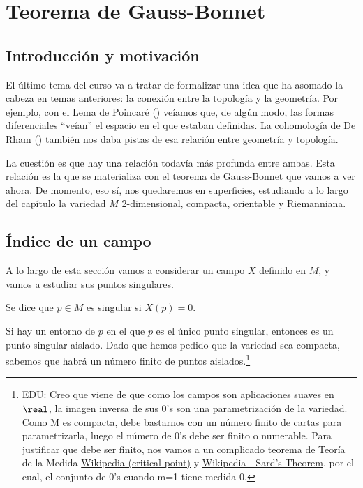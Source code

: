 \chapter{Teorema de Gauss-Bonnet}
\label{chap:GaussBonnet}

\section{Introducción y motivación}

El último tema del curso va a tratar de formalizar una idea que ha asomado la cabeza en temas anteriores: la conexión entre la topología y la geometría. Por ejemplo, con el Lema de Poincaré () veíamos que, de algún modo, las formas diferenciales ``veían'' el espacio en el que estaban definidas. La cohomología de De Rham () también nos daba pistas de esa relación entre geometría y topología.

La cuestión es que hay una relación todavía más profunda entre ambas. Esta relación es la que se materializa con el teorema de Gauss-Bonnet que vamos a ver ahora. De momento, eso sí, nos quedaremos en superficies, estudiando a lo largo del capítulo la variedad $M$ 2-dimensional, compacta, orientable y Riemanniana.

\section{Índice de un campo}

A lo largo de esta sección vamos a considerar un campo $X$ definido en $M$, y vamos a estudiar sus puntos singulares.

\begin{defn} Se dice que $p∈M$ es singular si $X(p) = 0$. \end{defn}

Si hay un entorno de $p$ en el que $p$ es el único punto singular, entonces es un punto singular aislado. Dado que hemos pedido que la variedad sea compacta, sabemos que habrá un número finito de puntos aislados.\footnote{EDU: Creo que viene de que como los campos son aplicaciones suaves en $\real$, la imagen inversa de sus 0's son una parametrización de la variedad. Como M es compacta, debe bastarnos con un número finito de cartas para parametrizarla, luego el número de 0's debe ser finito o numerable. Para justificar que debe ser finito, nos vamos a un complicado teorema de Teoría de la Medida \href{http://en.wikipedia.org/wiki/Critical\_point\_mathematics}{Wikipedia (critical point)} y \href{http://en.wikipedia.org/wiki/Sard's\_theorem}{Wikipedia - Sard's Theorem}, por el cual, el conjunto de 0's cuando m=1 tiene medida 0.}

